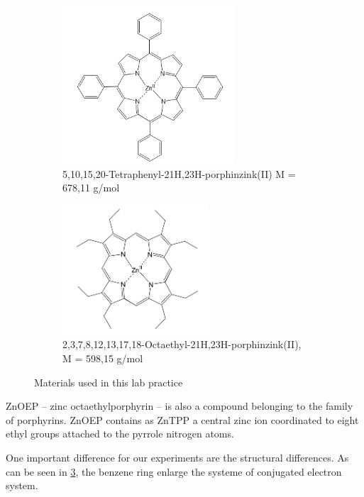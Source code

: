 \begin{figure}[h]
    \centering
    \begin{subfigure}[b]{0.5\textwidth}
        \centering
        \includegraphics[width =0.7\textwidth]{Bilder/Grundlagen/ZnTPP.png}      
        \caption{5,10,15,20-Tetraphenyl-21H,23H-porphinzink(II) \newline M = 678,11 g/mol}
      \label{fig:ZnTPP}
    \end{subfigure}
    \hspace{\fill}
    \begin{subfigure}[b]{0.3\textwidth}
      \centering
      \includegraphics[width = 0.6\textwidth]{Bilder/Grundlagen/ZnOEP.png}      
      \caption{2,3,7,8,12,13,17,18-Octaethyl-21H,23H-porphinzink(II), M = 598,15 g/mol}
      \label{fig:ZnOEP}
    \end{subfigure}
    \caption{Materials used in this lab practice}
    \label{fig:Polymere}
\end{figure}

ZnOEP -- zinc octaethylporphyrin -- is also a compound belonging to the family of porphyrins. ZnOEP contains as ZnTPP a central zinc ion
coordinated to eight ethyl groups attached to the pyrrole nitrogen atoms.

One important difference for our experiments are the structural differences. As can be seen in \cref{fig:Polymere}, the benzene ring enlarge the systeme of conjugated electron system. 

